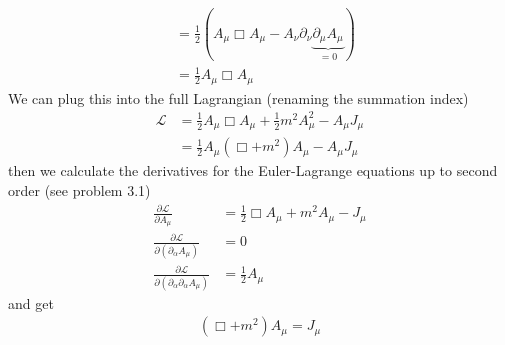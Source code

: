 \documentclass[10pt,a4paper]{article}
\theoremstyle{definition}
\begin{document}
\begin{enumerate}[label=(\alph*)]
\begin{align}
    &=\frac{1}{2}\left(A_\mu \Box A_\mu- A_\nu \partial_\nu \underbrace{\partial_\mu A_\mu}_{=0}\right)\\ 
    &=\frac{1}{2}A_\mu \Box A_\mu
\end{align}
We can plug this into the full Lagrangian (renaming the summation index)
\begin{align}
    \mathscr{L}&=\frac{1}{2}A_\mu \Box A_\mu+\frac{1}{2}m^2A_\mu^2-A_\mu J_\mu\\
    &=\frac{1}{2}A_\mu\left(\Box+m^2 \right)A_\mu-A_\mu J_\mu
\end{align} 
then we calculate the derivatives for the Euler-Lagrange equations up to second order (see problem 3.1)
\begin{align}
\frac{\partial\mathcal{L}}{\partial A_\mu}&=\frac{1}{2}\Box A_\mu+m^2A_\mu-J_\mu\\
\frac{\partial\mathcal{L}}{\partial (\partial_\alpha A_\mu)}&=0\\
\frac{\partial\mathcal{L}}{\partial (\partial_\alpha\partial_\alpha A_\mu)}&=\frac{1}{2}A_\mu
\end{align}
and get
\begin{align}
(\Box+m^2)A_\mu=J_\mu
\end{align}
   
\end{enumerate}
\end{document}
